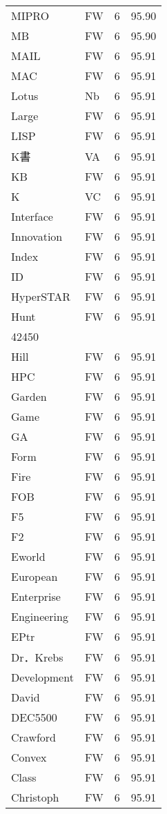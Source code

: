 \documentclass[twocolumn]{book}
\begin{document}
\begin{supertabular}{llrr}
MIPRO & FW & 6 &  95.90\\
MB & FW & 6 &  95.90\\
MAIL & FW & 6 &  95.91\\
MAC & FW & 6 &  95.91\\
Lotus & Nb & 6 &  95.91\\
Large & FW & 6 &  95.91\\
LISP & FW & 6 &  95.91\\
K書 & VA & 6 &  95.91\\
KB & FW & 6 &  95.91\\
K & VC & 6 &  95.91\\
Interface & FW & 6 &  95.91\\
Innovation & FW & 6 &  95.91\\
Index & FW & 6 &  95.91\\
ID & FW & 6 &  95.91\\
HyperSTAR & FW & 6 &  95.91\\
Hunt & FW & 6 &  95.91\\
42450\\
Hill & FW & 6 &  95.91\\
HPC & FW & 6 &  95.91\\
Garden & FW & 6 &  95.91\\
Game & FW & 6 &  95.91\\
GA & FW & 6 &  95.91\\
Form & FW & 6 &  95.91\\
Fire & FW & 6 &  95.91\\
FOB & FW & 6 &  95.91\\
F5 & FW & 6 &  95.91\\
F2 & FW & 6 &  95.91\\
Eworld & FW & 6 &  95.91\\
European & FW & 6 &  95.91\\
Enterprise & FW & 6 &  95.91\\
Engineering & FW & 6 &  95.91\\
EPtr & FW & 6 &  95.91\\
Dr．Krebs & FW & 6 &  95.91\\
Development & FW & 6 &  95.91\\
David & FW & 6 &  95.91\\
DEC5500 & FW & 6 &  95.91\\
Crawford & FW & 6 &  95.91\\
Convex & FW & 6 &  95.91\\
Class & FW & 6 &  95.91\\
Christoph & FW & 6 &  95.91\\

\end{supertabular}
\end{document}
